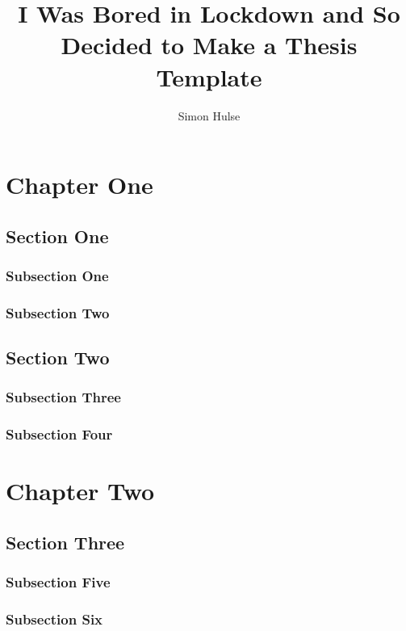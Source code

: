\documentclass{SGH_thesis}
\title{I Was Bored in Lockdown and So Decided to Make a Thesis Template}
\author{Simon Hulse}
\begin{document}

\maketitle

\tableofcontents


\chapter{Chapter One}
\lipsum[1-4]
\section{Section One}
\lipsum[5-8]
\subsection{Subsection One}
\lipsum[9-12]
\subsection{Subsection Two}
\lipsum[13-16]
\section{Section Two}
\lipsum[17-20]
\subsection{Subsection Three}
\lipsum[21-24]
\subsection{Subsection Four}
\lipsum[25-28]

\chapter{Chapter Two}
\lipsum[29-32]
\section{Section Three}
\lipsum[33-36]
\subsection{Subsection Five}
\lipsum[37-40]
\subsection{Subsection Six}
\lipsum[41-44]
\end{document}

